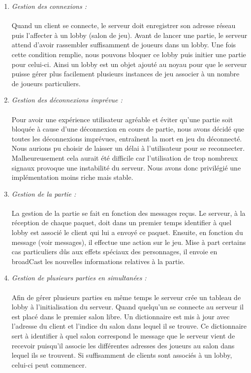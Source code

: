 \documentclass[a4paper,11pt]{article}
\begin{document}
\begin{enumerate}[label=(\roman*)]
	\item \textit{Gestion des connexions :} \\\\
	Quand un client se connecte, le serveur doit enregistrer son adresse réseau puis l’affecter à un lobby (salon de jeu). Avant de lancer une partie, le serveur attend d’avoir rassembler suffisamment de joueurs dans un lobby. Une fois cette condition remplie, nous pouvons bloquer ce lobby puis initier une partie pour celui-ci. Ainsi un lobby est un objet ajouté au noyau pour que le serveur puisse gérer plus facilement plusieurs instances de jeu associer à un nombre de joueurs particuliers.\\

	
	\item \textit{Gestion des déconnexions imprévue :} \\\\
	Pour avoir une expérience utilisateur agréable et éviter qu’une partie soit bloquée à cause d’une déconnexion en cours de partie, nous avons décidé que toutes les déconnexions imprévues, entraînent la mort en jeu du déconnecté. Nous aurions pu choisir de laisser un délai à l’utilisateur pour se reconnecter. Malheureusement cela aurait été difficile car l’utilisation de trop nombreux signaux provoque une instabilité du serveur. Nous avons donc privilégié une implémentation moins riche mais stable.\\

	\item \textit{Gestion de la partie :} \\\\
	La gestion de la partie se fait en fonction des messages reçus. Le serveur, à la réception de chaque paquet, doit dans un premier temps identifier à quel lobby est associé le client qui lui a envoyé ce paquet. Ensuite, en fonction du message (voir messages), il effectue une action sur le jeu. Mise à part certains cas particuliers dûs aux effets spéciaux des personnages, il envoie en broadCast les nouvelles informations relatives à la partie.\\

\newpage

	\item \textit{Gestion de plusieurs parties en simultanées :} \\\\
	Afin de gérer plusieurs parties en même temps le serveur crée un tableau de lobby à l'initialisation du serveur. Quand quelqu’un se connecte au serveur il est placé dans le premier salon libre. Un dictionnaire est mis à jour avec l’adresse du client et l’indice du salon dans lequel il se trouve. Ce dictionnaire sert à identifier à quel salon correspond le message que le serveur vient de recevoir puisqu’il associe les différentes adresses des joueurs au salon dans lequel ils se trouvent. Si suffisamment de clients sont associés à un lobby, celui-ci peut commencer. \\


\end{enumerate}
\end{document}
